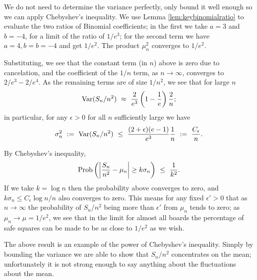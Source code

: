 \documentclass[12pt,reqno]{amsart}
\numberwithin{equation}{section}
\theoremstyle{plain}
\newcommand\be{\begin{equation}}
\newcommand\ee{\end{equation}}
\begin{document}
We do not need to determine the variance perfectly, only bound it well enough so we can apply Chebyshev's inequality. We use Lemma \ref{lem:keybinomialratio} to evaluate the two ratios of Binomial coefficients; in the first we take $a=3$ and $b=-4$, for a limit of the ratio of $1/e^3$; for the second term we have $a=4, b=b=-4$ and get $1/e^2$. The product $\mu_n^2$ converges to $1/e^2$.

Substituting, we see that the constant term (in $n$) above is zero due to cancelation, and the coefficient of the $1/n$ term, as $n\to\infty$, converges to $2/e^3 - 2/e^4$. As the remaining terms are of size $1/n^2$, we see that for large $n$ \be {\rm Var}(S_n/n^2) \ \approx \ \frac{2}{e^3} \left(1 - \frac1{e}\right) \frac{2}{n}; \ee in particular, for any $\epsilon > 0$ for all $n$ sufficiently large we have \be \sigma_n^2 \ := \ {\rm Var}(S_n/n^2) \ \le \ \frac{(2+\epsilon)(e-1)}{e^3} \frac1{n} \ := \ \frac{C_\epsilon}{n}. \ee

By Chebyshev's inequality, \be {\rm Prob}\left(\left|\frac{S_n}{n^2} - \mu_n\right| \ge k \sigma_n\right) \ \le \ \frac1{k^2}. \ee If we take $k = \log n$ then the probability above converges to zero, and $k \sigma_n \le C_\epsilon \log n / n$ also converges to zero. This means for any fixed $\epsilon' > 0$ that as $n\to\infty$ the probability of $S_n/n^2$ being more than $\epsilon'$ from $\mu_n$ tends to zero; as $\mu_n \to \mu = 1/e^2$, we see that in the limit for almost all boards the percentage of safe squares can be made to be as close to $1/e^2$ as we wish.

The above result is an example of the power of Chebyshev's inequality. Simply by bounding the variance we are able to show that $S_n/n^2$ concentrates on the mean; unfortunately it is not strong enough to say anything about the fluctuations about the mean.


\end{document}
